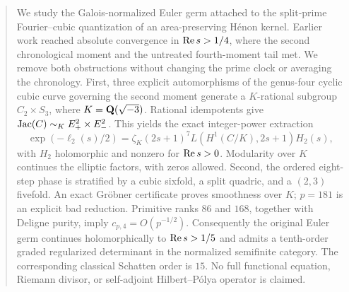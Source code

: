 \begin{abstract}
We study the Galois-normalized Euler germ attached to the split-prime
Fourier--cubic quantization of an area-preserving H\'enon kernel.  Earlier
work reached absolute convergence in \(\RePart s>1/4\), where the second
chronological moment and the untreated fourth-moment tail met.  We remove
both obstructions without changing the prime clock or averaging the
chronology.  First, three explicit automorphisms of the genus-four cyclic
cubic curve governing the second moment generate a \(K\)-rational subgroup
\(C_2\times S_3\), where \(K=\QQ(\sqrt{-3})\).  Rational idempotents give
\(\Jac(C)\sim_K E_+^2\times E_-^2\).  This yields the exact integer-power
extraction
\[
 \exp(-\ell_2(s)/2)
 =\zeta_K(2s+1)^7L(H^1(C/K),2s+1)H_2(s),
\]
with \(H_2\) holomorphic and nonzero for \(\RePart s>0\).  Modularity over
\(K\) continues the elliptic factors, with zeros allowed.  Second, the
ordered eight-step phase is stratified by a cubic sixfold, a split quadric,
and a \((2,3)\) fivefold.  An exact Gr\"obner certificate proves
smoothness over \(K\); \(p=181\) is an explicit bad
reduction.  Primitive ranks \(86\) and \(168\), together with Deligne
purity, imply \(c_{p,4}=O(p^{-1/2})\).  Consequently the original Euler germ
continues holomorphically to \(\RePart s>1/5\) and admits a tenth-order
graded regularized determinant in the normalized semifinite category.
The corresponding classical Schatten order is \(15\).  No full functional
equation, Riemann divisor, or self-adjoint Hilbert--P\'olya operator is
claimed.
\end{abstract}
